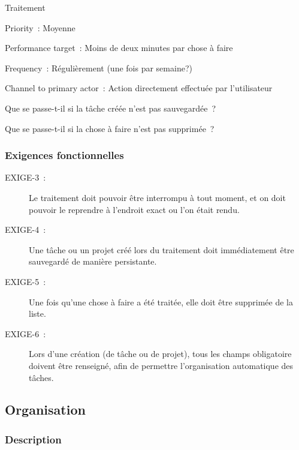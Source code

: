 \begin{usecase}{Traitement}
	\begin{relatedinformation}
	\item[Priority~:] Moyenne
	\item[Performance target~:] Moins de deux minutes par chose à faire
	\item[Frequency~:] Régulièrement (une fois par semaine?)
	\item[Channel to primary actor~:] Action directement effectuée par l'utilisateur
	\\
	\end{relatedinformation}
	\begin{openissues}
	\item Que se passe-t-il si la tâche créée n'est pas sauvegardée~?
	\item Que se passe-t-il si la chose à faire n'est pas supprimée~?
	\\
	\end{openissues}
	\end{usecase}


\subsubsection{Exigences fonctionnelles}

\begin{description}
\item[EXIGE-3~:] Le traitement doit pouvoir être interrompu à tout moment, et on doit pouvoir le reprendre à l'endroit exact ou l'on était rendu.
\item[EXIGE-4~:] Une tâche ou un projet créé lors du traitement doit immédiatement être sauvegardé de manière persistante.
\item[EXIGE-5~:] Une fois qu'une chose à faire a été traitée, elle doit être supprimée de la liste.
\item[EXIGE-6~:] Lors d'une création (de tâche ou de projet), tous les champs obligatoire doivent être renseigné, afin de permettre l'organisation automatique des tâches.
 \end{description}


	\subsection{Organisation}

\subsubsection{Description}

